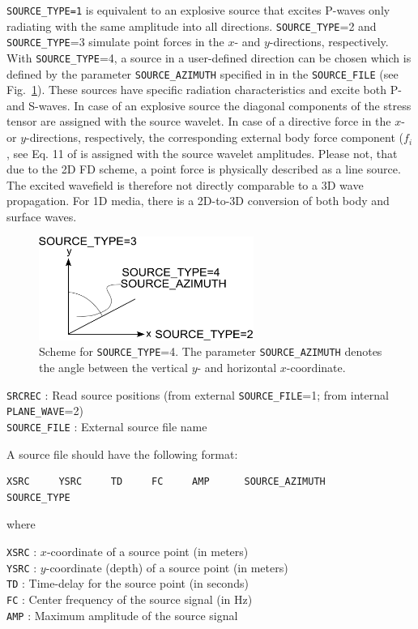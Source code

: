 \texttt{SOURCE\_TYPE=1} is equivalent to an explosive source that excites P-waves only radiating with the same amplitude into all directions. \texttt{SOURCE\_TYPE}=2 and \texttt{SOURCE\_TYPE}=3 simulate point forces in the $x$- and $y$-directions, respectively. With \texttt{SOURCE\_TYPE}=4, a source in a user-defined direction can be chosen which is defined by the parameter \texttt{SOURCE\_AZIMUTH} specified in in the \texttt{SOURCE\_FILE} (see Fig.~\ref{fig_source_azimuth}). These sources have specific radiation characteristics and excite both P- and S-waves. In case of an explosive source the diagonal components of the stress tensor are assigned with the source wavelet. In case of a directive force in the $x$- or $y$-directions, respectively, the corresponding external body force component ($f_i$, see Eq. 11 of \citep{bohlen:02} is assigned with the source wavelet amplitudes. Please not, that due to the 2D FD scheme, a point force is physically described as a line source. The excited wavefield is therefore not directly comparable to a 3D wave propagation. For 1D media, there is a 2D-to-3D conversion of both body and surface waves.
\begin{figure}[ht!]
\centering
    \includegraphics[width=7cm,angle=0]{figures/source_azimuth.pdf}
    \caption{Scheme for \texttt{SOURCE\_TYPE}=4. The parameter \texttt{SOURCE\_AZIMUTH} denotes the angle between the vertical $y$- and horizontal $x$-coordinate.}
    \label{fig_source_azimuth}
\end{figure}

\texttt{SRCREC} : Read source positions (from external \texttt{SOURCE\_FILE}=1; from internal \texttt{PLANE\_WAVE}=2)\\
\texttt{SOURCE\_FILE} : External source file name

A source file should have the following format:
\begin{verbatim}
XSRC     YSRC     TD     FC     AMP      SOURCE_AZIMUTH     SOURCE_TYPE
\end{verbatim}

where

\texttt{XSRC} : $x$-coordinate of a source point (in meters)\\
\texttt{YSRC} : $y$-coordinate (depth) of a source point (in meters)\\
\texttt{TD} : Time-delay for the source point (in seconds)\\
\texttt{FC} : Center frequency of the source signal (in Hz)\\
\texttt{AMP} : Maximum amplitude of the source signal

